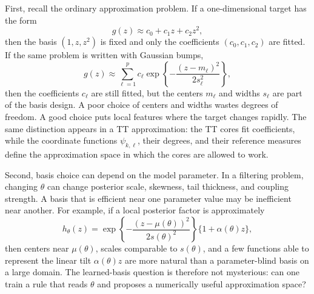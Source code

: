 \documentclass[11pt]{article}
\numberwithin{equation}{section}
\begin{document}
First, recall the ordinary approximation problem.  If a one-dimensional target
has the form
\begin{equation}
    g(z)\approx c_0+c_1z+c_2z^2,
    \label{eq:p33-ordinary-polynomial-approximation}
\end{equation}
then the basis \((1,z,z^2)\) is fixed and only the coefficients
\((c_0,c_1,c_2)\) are fitted.  If the same problem is written with Gaussian
bumps,
\begin{equation}
    g(z)\approx
    \sum_{\ell=1}^{p}c_\ell
    \exp\left\{-\frac{(z-m_\ell)^2}{2s_\ell^2}\right\},
    \label{eq:p33-gaussian-bump-basis}
\end{equation}
then the coefficients \(c_\ell\) are still fitted, but the centers
\(m_\ell\) and widths \(s_\ell\) are part of the basis design.  A poor choice
of centers and widths wastes degrees of freedom.  A good choice puts local
features where the target changes rapidly.  The same distinction appears in a
TT approximation: the TT cores fit coefficients, while the coordinate
functions \(\psi_{k,\ell}\), their degrees, and their reference measures
define the approximation space in which the cores are allowed to work.

Second, basis choice can depend on the model parameter.  In a filtering
problem, changing \(\theta\) can change posterior scale, skewness, tail
thickness, and coupling strength.  A basis that is efficient near one
parameter value may be inefficient near another.  For example, if a local
posterior factor is approximately
\begin{equation}
    h_\theta(z)
    =
    \exp\left\{-\frac{(z-\mu(\theta))^2}{2s(\theta)^2}\right\}
    \{1+\alpha(\theta)z\},
    \label{eq:p33-parameter-dependent-local-shape}
\end{equation}
then centers near \(\mu(\theta)\), scales comparable to \(s(\theta)\), and a
few functions able to represent the linear tilt \(\alpha(\theta)z\) are more
natural than a parameter-blind basis on a large domain.  The learned-basis
question is therefore not mysterious: can one train a rule that reads
\(\theta\) and proposes a numerically useful approximation space?
\end{document}
